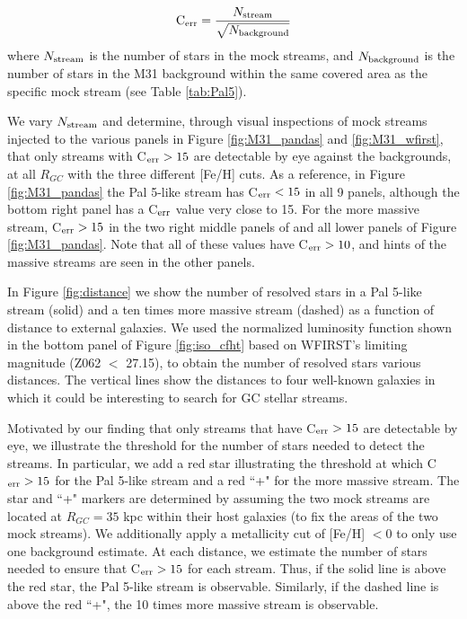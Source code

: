 \documentclass[twocolumn]{aastex62}
\begin{document}
\begin{equation}
{\rm C}_{\rm err} = \frac{N_{\rm stream}}{\sqrt{N_{\rm background}}}
\end{equation}
where $N_{\rm stream}$ is the number of stars in the mock streams, and $N_{\rm background}$ is the number of stars in the M31 background within the same covered area as the specific mock stream (see Table \ref{tab:Pal5}). 

We vary $N_{\rm stream}$ and determine, through visual inspections of mock streams injected to the various panels in Figure \ref{fig:M31_pandas} and \ref{fig:M31_wfirst}, that only streams with C$_{\rm err} > 15$ are detectable by eye against the backgrounds, at all $R_{GC}$ with the three different [Fe/H] cuts. As a reference, in Figure \ref{fig:M31_pandas} the Pal 5-like stream has C$_{\rm err} < 15$ in all 9 panels, although the bottom right panel has a  C$_{\rm err}$ value very close to 15. For the more massive stream, C$_{\rm err} > 15$ in the two right middle panels of and all lower panels of Figure \ref{fig:M31_pandas}. Note that all of these values have  C$_{\rm err} > 10$, and hints of the massive streams are seen in the other panels. 

In Figure \ref{fig:distance} we show the number of resolved stars in a Pal 5-like stream (solid) and a ten times more massive stream (dashed) as a function of distance to external galaxies. We used the normalized luminosity function shown in the bottom panel of Figure \ref{fig:iso_cfht} based on WFIRST's limiting magnitude (Z062 $<$ 27.15), to obtain the number of resolved stars various distances. The vertical lines show the distances to four well-known galaxies in which it could be interesting to search for GC stellar streams. 

Motivated by our finding that only streams that have C$_{\rm err} > 15$ are detectable by eye,  we illustrate the threshold for the number of stars needed to detect the streams. In particular, we add a red star illustrating the threshold at which C$_{\rm err} > 15$ for the Pal 5-like stream and a red ``+" for the more massive stream. The star and ``+" markers are determined by assuming the two mock streams are located at $R_{GC} = 35$ kpc within their host galaxies (to fix the areas of the two mock streams). We additionally apply a metallicity cut of [Fe/H] $<0$ to only use one background estimate.  At each distance, we estimate the number of stars needed to ensure that C$_{\rm err} > 15$ for each stream. Thus, if the solid line is above the red star, the Pal 5-like stream is observable. Similarly, if the dashed line is above the red ``+", the 10 times more massive stream is observable. 
\end{document}
